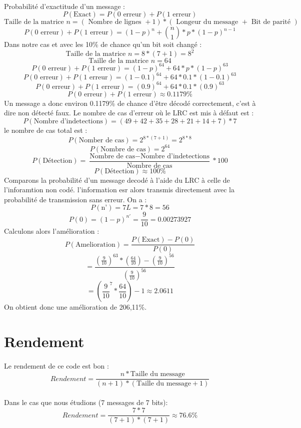         \paragraph{}
Probabilité d'exactitude d'un message :
\[  P(\text{Exact}) = P(\text{0 erreur}) + P(\text{1 erreur}) \]
\[ \text{Taille de la matrice } n = ( \text{ Nombre de lignes } + 1 ) * ( \text{ Longeur du message } + \text{ Bit de parité } ) \]
\[ P(\text{0 erreur}) + P(\text{1 erreur}) = (1-p)^{n} + {n\choose 1}*p*(1-p)^{n-1} \]
Dans notre cas et avec les 10\% de chance qu'un bit soit changé :
\[ \text{Taille de la matrice } n = 8*(7+1) = 8^{2} \]
\[ \text{Taille de la matrice } n = 64 \]
\[ P(\text{0 erreur}) + P(\text{1 erreur}) = (1-p)^{64} + 64*p*(1-p)^{63} \]
\[ P(\text{0 erreur}) + P(\text{1 erreur}) = (1-0.1)^{64} + 64*0.1*(1-0.1)^{63} \]
\[ P(\text{0 erreur}) + P(\text{1 erreur}) = (0.9)^{64} + 64*0.1*(0.9)^{63} \]
\[ P(\text{0 erreur}) + P(\text{1 erreur}) \approx 0.1179\% \]
Un message a donc environ 0.1179\% de chance d'être décodé correctement, c'est à dire non détecté faux.
Le nombre de cas d'erreur où le LRC est mis à défaut est :
\[  P(\text{Nombre d'indetections}) = (49+42+35+28+21+14+7)*7 \]
le nombre de cas total est  :
\[  P(\text{Nomber de cas}) = 2^{8*(7+1)} = 2^{8*8} \]
\[  P(\text{Nombre de cas}) = 2^{64} \]
\[  P(\text{Détection}) = \frac{\text{Nombre de cas} - \text{Nombre d'indetections}}{\text{Nombre de cas}}*100 \]
\[  P(\text{Détection}) \approx 100\% \]
Comparons la probabilité d'un message decodé à l'aide du LRC à celle de l'inforamtion non codé.
l'information esr alors transmis directement avec la probabilité de transmission sans erreur.
On a :
\[  P(\text{n'}) = 7L=7*8=56 \]
\[  P(\text{0}) = (1-p)^{n'}=\frac{9}{10} = 0.00273927\]
Calculons alors l'amélioration :
\[  P(\text{Amelioration}) = \frac{P(\text{Exact}) - P(\text{0})}{P(\text{0})} \]
\[ =\frac{(\frac{9}{10})^{63}*(\frac{64}{10})-(\frac{9}{10})^{56}}{(\frac{9}{10})^{56}} \]
\[ =(\frac{9}{10}^{7}*\frac{64}{10})-1 \approx 2.0611 \]
On obtient donc une amélioration de 206,11\%.
    \section{Rendement}

        \paragraph{}
Le rendement de ce code est bon :
\[  Rendement = \frac{n*\text{Taille du message}}{(n+1)*(\text{Taille du message}+1)} \]
        \paragraph{}
Dans le cas que nous étudions (7 messages de 7 bits):
\[  Rendement = \frac{7*7}{(7+1)*(7+1)} \approx 76.6\% \]
